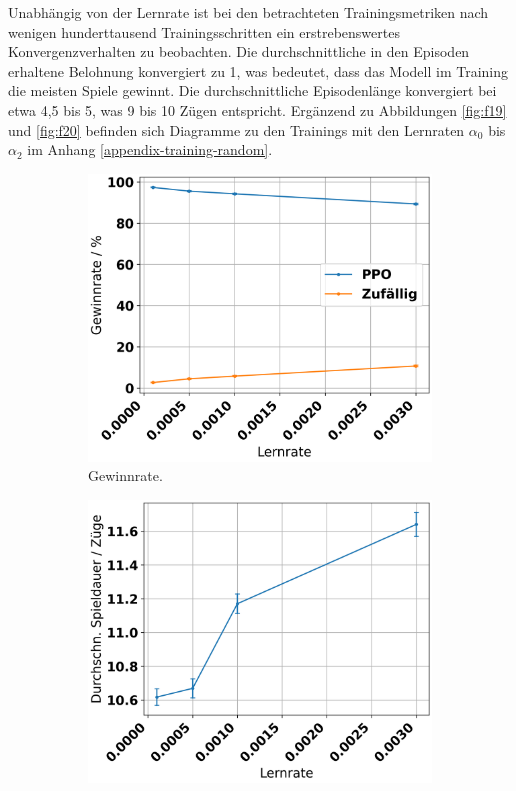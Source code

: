 Unabhängig von der Lernrate ist bei den betrachteten Trainingsmetriken nach wenigen hunderttausend Trainingsschritten ein erstrebenswertes Konvergenzverhalten zu beobachten. Die durchschnittliche in den Episoden erhaltene Belohnung konvergiert zu 1, was bedeutet, dass das Modell im Training die meisten Spiele gewinnt. Die durchschnittliche Episodenlänge konvergiert bei etwa 4,5 bis 5, was 9 bis 10 Zügen entspricht. Ergänzend zu Abbildungen \ref{fig:f19} und \ref{fig:f20} befinden sich Diagramme zu den Trainings mit den Lernraten $\alpha_0$ bis $\alpha_2$ im Anhang \ref{appendix-training-random}.

\begin{figure}[ht!]%
	\begin{subfigure}[b]{0.48\textwidth}
		\includegraphics[width=\textwidth]{Bilder/ppo_vs_random_win_rate_vs_learning_rate.png}
		\caption{Gewinnrate.}
		\label{fig:f21}
	\end{subfigure}
	\hfill
	\begin{subfigure}[b]{0.48\textwidth}
		\includegraphics[width=\textwidth]{Bilder/ppo_vs_random_game_length_vs_learning_rate.png}

\end{subfigure}
\end{figure}
